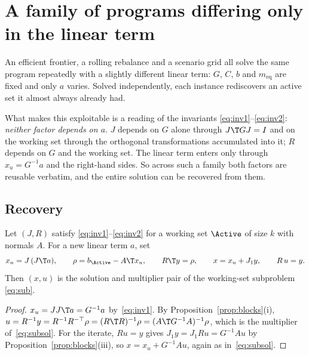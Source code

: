 \section{A family of programs differing only in the linear term}
\label{sec:sweep}

An efficient frontier, a rolling rebalance and a scenario grid all solve the same
program repeatedly with a slightly different linear term: $G$, $C$, $b$ and
$m_{\mathrm{eq}}$ are fixed and only $a$ varies. Solved independently, each
instance rediscovers an active set it almost always already had.

What makes this exploitable is a reading of the invariants
\eqref{eq:inv1}--\eqref{eq:inv2}: \emph{neither factor depends on $a$}. $J$
depends on $G$ alone through $J\T G J = I$ and on the working set through the
orthogonal transformations accumulated into it; $R$ depends on $G$ and the working
set. The linear term enters only through $x_u = G^{-1}a$ and the right-hand sides.
So across such a family both factors are reusable verbatim, and the entire
solution can be recovered from them.

\subsection{Recovery}

\begin{proposition}\label{prop:recover}
Let $(J,R)$ satisfy \eqref{eq:inv1}--\eqref{eq:inv2} for a working set $\Active$
of size $k$ with normals $A$. For a new linear term $a$, set
\begin{equation}
  x_u = J\,(J\T a),
  \qquad
  \rho = b_\Active - A\T x_u,
  \qquad
  R\T y = \rho,
  \qquad
  x = x_u + J_1 y,
  \qquad
  R\,u = y .
  \label{eq:recover}
\end{equation}
Then $(x,u)$ is the solution and multiplier pair of the working-set subproblem
\eqref{eq:sub}.
\end{proposition}

\begin{proof}
$x_u = JJ\T a = G^{-1}a$ by~\eqref{eq:inv1}. By Proposition~\ref{prop:blocks}(i),
$u = R^{-1}y = R^{-1}R^{-\top}\rho = (R\T R)^{-1}\rho = (A\T G^{-1}A)^{-1}\rho$,
which is the multiplier of~\eqref{eq:subsol}. For the iterate, $Ru = y$ gives
$J_1 y = J_1 R u = G^{-1}A u$ by Proposition~\ref{prop:blocks}(iii), so
$x = x_u + G^{-1}Au$, again as in~\eqref{eq:subsol}.
\end{proof}

